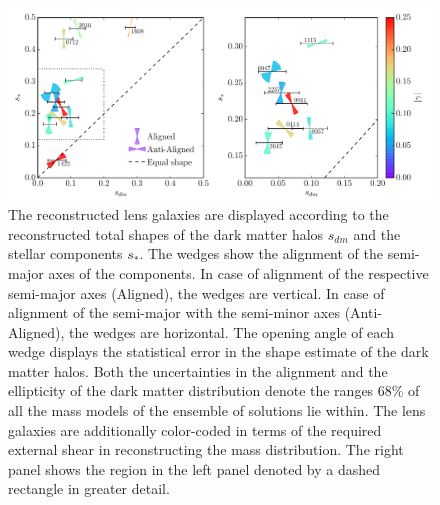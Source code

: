 \documentclass[useAMS,usenatbib]{mn2e}
\begin{document}
\begin{figure}
  \centering
  \includegraphics[width=\linewidth]{Figures/wedges_shears.pdf}
  \caption[width=\linewidth]{The reconstructed lens galaxies are displayed according to the reconstructed total shapes of the dark matter halos $s_{dm}$ and the stellar components $s_{*}$. The wedges show the alignment of the semi-major axes of the components. In case of alignment of the respective semi-major axes (Aligned), the wedges are vertical. In case of alignment of the semi-major with the semi-minor axes (Anti-Aligned), the wedges are horizontal. The opening angle of each wedge displays the statistical error in the shape estimate of the dark matter halos. Both the uncertainties in the alignment and the ellipticity of the dark matter distribution denote the ranges $68\%$ of all the mass models of the ensemble of solutions lie within. The lens galaxies are additionally color-coded in terms of the required external shear in reconstructing the mass distribution. The right panel shows the region in the left panel denoted by a dashed rectangle in greater detail.}
  \label{fig:wedgesall}
\end{figure}
\end{document}
